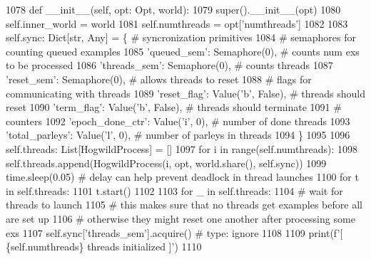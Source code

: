 \begin{DoxyCode}
1078     \textcolor{keyword}{def }\_\_init\_\_(self, opt: Opt, world):
1079         super().\_\_init\_\_(opt)
1080         self.inner\_world = world
1081         self.numthreads = opt[\textcolor{stringliteral}{'numthreads'}]
1082 
1083         self.sync: Dict[str, Any] = \{  \textcolor{comment}{# syncronization primitives}
1084             \textcolor{comment}{# semaphores for counting queued examples}
1085             \textcolor{stringliteral}{'queued\_sem'}: Semaphore(0),  \textcolor{comment}{# counts num exs to be processed}
1086             \textcolor{stringliteral}{'threads\_sem'}: Semaphore(0),  \textcolor{comment}{# counts threads}
1087             \textcolor{stringliteral}{'reset\_sem'}: Semaphore(0),  \textcolor{comment}{# allows threads to reset}
1088             \textcolor{comment}{# flags for communicating with threads}
1089             \textcolor{stringliteral}{'reset\_flag'}: Value(\textcolor{stringliteral}{'b'}, \textcolor{keyword}{False}),  \textcolor{comment}{# threads should reset}
1090             \textcolor{stringliteral}{'term\_flag'}: Value(\textcolor{stringliteral}{'b'}, \textcolor{keyword}{False}),  \textcolor{comment}{# threads should terminate}
1091             \textcolor{comment}{# counters}
1092             \textcolor{stringliteral}{'epoch\_done\_ctr'}: Value(\textcolor{stringliteral}{'i'}, 0),  \textcolor{comment}{# number of done threads}
1093             \textcolor{stringliteral}{'total\_parleys'}: Value(\textcolor{stringliteral}{'l'}, 0),  \textcolor{comment}{# number of parleys in threads}
1094         \}
1095 
1096         self.threads: List[HogwildProcess] = []
1097         \textcolor{keywordflow}{for} i \textcolor{keywordflow}{in} range(self.numthreads):
1098             self.threads.append(HogwildProcess(i, opt, world.share(), self.sync))
1099             time.sleep(0.05)  \textcolor{comment}{# delay can help prevent deadlock in thread launches}
1100         \textcolor{keywordflow}{for} t \textcolor{keywordflow}{in} self.threads:
1101             t.start()
1102 
1103         \textcolor{keywordflow}{for} \_ \textcolor{keywordflow}{in} self.threads:
1104             \textcolor{comment}{# wait for threads to launch}
1105             \textcolor{comment}{# this makes sure that no threads get examples before all are set up}
1106             \textcolor{comment}{# otherwise they might reset one another after processing some exs}
1107             self.sync[\textcolor{stringliteral}{'threads\_sem'}].acquire()  \textcolor{comment}{# type: ignore}
1108 
1109         print(f\textcolor{stringliteral}{'[ \{self.numthreads\} threads initialized ]'})
1110 
\end{DoxyCode}


